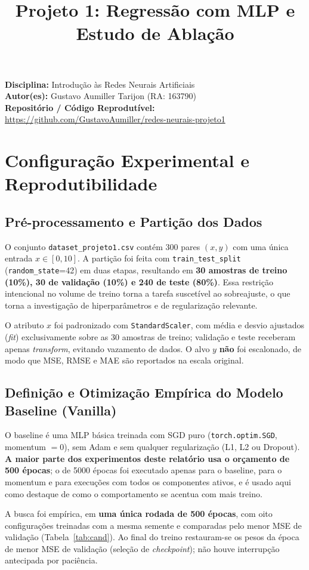\documentclass[11pt,a4paper]{article}
\title{Projeto 1: Regressão com MLP e Estudo de Ablação}
\author{}
\date{}
\newcommand{\autor}{Gustavo Aumiller Tarijon}
\newcommand{\raaluno}{163790}
\newcommand{\repo}{https://github.com/GustavoAumiller/redes-neurais-projeto1}
\begin{document}
\maketitle
\vspace{-2.2cm}
\noindent\textbf{Disciplina:} Introdução às Redes Neurais Artificiais\\
\textbf{Autor(es):} \autor{} (RA: \raaluno)\\
\textbf{Repositório / Código Reprodutível:} \url{\repo}

\section{Configuração Experimental e Reprodutibilidade}

\subsection{Pré-processamento e Partição dos Dados}
O conjunto \texttt{dataset\_projeto1.csv} contém 300 pares $(x,y)$ com uma única entrada $x\in[0,10]$. A partição foi feita com \texttt{train\_test\_split} (\texttt{random\_state}=42) em duas etapas, resultando em \textbf{30 amostras de treino (10\%), 30 de validação (10\%) e 240 de teste (80\%)}. Essa restrição intencional no volume de treino torna a tarefa suscetível ao sobreajuste, o que torna a investigação de hiperparâmetros e de regularização relevante.

O atributo $x$ foi padronizado com \texttt{StandardScaler}, com média e desvio ajustados (\textit{fit}) exclusivamente sobre as 30 amostras de treino; validação e teste receberam apenas \textit{transform}, evitando vazamento de dados. O alvo $y$ \textbf{não} foi escalonado, de modo que MSE, RMSE e MAE são reportados na escala original.

\subsection{Definição e Otimização Empírica do Modelo Baseline (Vanilla)}
O baseline é uma MLP básica treinada com SGD puro (\texttt{torch.optim.SGD}, momentum $=0$), sem Adam e sem qualquer regularização (L1, L2 ou Dropout). \textbf{A maior parte dos experimentos deste relatório usa o orçamento de 500 épocas}; o de 5000 épocas foi executado apenas para o baseline, para o momentum e para execuções com todos os componentes ativos, e é usado aqui como destaque de como o comportamento se acentua com mais treino.

A busca foi empírica, em \textbf{uma única rodada de 500 épocas}, com oito configurações treinadas com a mesma semente e comparadas pelo menor MSE de validação (Tabela~\ref{tab:cand}). Ao final do treino restauram-se os pesos da época de menor MSE de validação (seleção de \textit{checkpoint}); não houve interrupção antecipada por paciência.
\end{document}
